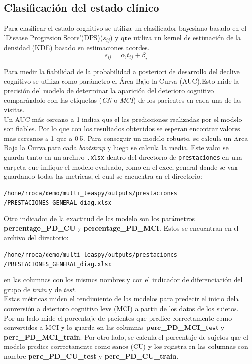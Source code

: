 \subsection{Clasificación del estado clínico}
Para clasificar el estado cognitivo se utiliza  un clasificador bayesiano basado en el 'Disease Progresion Score'(DPS)($s_{ij}$) y que utiliza un kernel de estimación de la densidad (KDE) basado en estimaciones acordes.
\begin{equation}
	s_{ij}=\alpha_{i}t_{ij}+\beta_{i}
\end{equation}

 Para medir la fiabilidad de la probabilidad a posteriori de desarrollo del declive cognitivo se utiliza como parámetro el Área Bajo la Curva (AUC).Esto mide la precisión del modelo de determinar la aparición del deterioro cognitivo comparándolo con las etiquetas (\textit{CN} o \textit{MCI}) de los pacientes en cada una de las visitas.\\
 
 Un AUC más cercano a 1 indica que el las predicciones realizadas por el modelo son fiables. Por lo que con los resultados obtenidos se esperan encontrar valores mas cercanos a 1 que a 0,5. Para conseguir un modelo robusto, se calcula un Area Bajo la Curva para cada \textit{bootstrap} y luego se calcula la media. Este valor se guarda tanto en un archivo \texttt{.xlsx} dentro del directorio de \texttt{prestaciones} en una carpeta que indique el modelo evaluado, como en el excel general donde se van guardando todas las metricas, el cual se encuentra en el directorio:

 \begin{center}
 	\texttt{/home/rroca/demo/multi\_leaspy/outputs/prestaciones
 		/PRESTACIONES\_GENERAL\_diag.xlsx}
 \end{center}

Otro indicador de la exactitud de los modelo son los parámetros \textbf{percentage\_PD\_CU} y \textbf{percentage\_PD\_MCI}. Estos se encuentran en el archivo del directorio:
\begin{center}
	\texttt{/home/rroca/demo/multi\_leaspy/outputs/prestaciones
		/PRESTACIONES\_GENERAL\_diag.xlsx}
\end{center}
en las columnas con los mismos nombres y con el indicador de diferenciación del grupo de \textit{train} y de \textit{test}. \\

Estas métricas miden el rendimiento de los modelos para predecir el inicio dela conversión a deterioro cognitivo leve (MCI) a partir de los datos de los sujetos. Por un lado mide el porcentaje de pacientes que predice correctamente como convertidos a MCI y lo guarda en las columnas \textbf{perc\_PD\_MCI\_test} y \textbf{perc\_PD\_MCI\_train}. Por otro lado, se calcula el porcentaje de sujetos que el modelo predice correctamente como sanos (CU) y los registra en las columnas con nombre \textbf{perc\_PD\_CU\_test} y \textbf{perc\_PD\_CU\_train}. 





